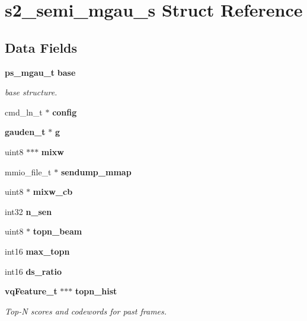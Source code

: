 \section{s2\+\_\+semi\+\_\+mgau\+\_\+s Struct Reference}
\label{structs2__semi__mgau__s}
\subsection*{Data Fields}
\begin{DoxyCompactItemize}
\item 
\textbf{ ps\+\_\+mgau\+\_\+t} \textbf{ base}
\begin{DoxyCompactList}\small\item\em base structure. \end{DoxyCompactList}\item 
\mbox{\label{structs2__semi__mgau__s_ababf1e9522fb14c351df9a6b6d3957bc}} 
cmd\+\_\+ln\+\_\+t $\ast$ {\bfseries config}
\item 
\mbox{\label{structs2__semi__mgau__s_ab9d5d5dcafa40af8869ceabb60a8d35b}} 
\textbf{ gauden\+\_\+t} $\ast$ {\bfseries g}
\item 
\mbox{\label{structs2__semi__mgau__s_a1207b5db7e37e9477f3b55cc2d447050}} 
uint8 $\ast$$\ast$$\ast$ {\bfseries mixw}
\item 
\mbox{\label{structs2__semi__mgau__s_a66a60126fe057d36640cbf69f916bca3}} 
mmio\+\_\+file\+\_\+t $\ast$ {\bfseries sendump\+\_\+mmap}
\item 
\mbox{\label{structs2__semi__mgau__s_a20ec32cb8c38fb48909b2cc7c5412c3b}} 
uint8 $\ast$ {\bfseries mixw\+\_\+cb}
\item 
\mbox{\label{structs2__semi__mgau__s_a021287621e71f8b74f23197d0efd1e9e}} 
int32 {\bfseries n\+\_\+sen}
\item 
\mbox{\label{structs2__semi__mgau__s_af530876b144ac13df103afe2ccdba2fc}} 
uint8 $\ast$ {\bfseries topn\+\_\+beam}
\item 
\mbox{\label{structs2__semi__mgau__s_adda80afc828a938dcdd08f976417d35a}} 
int16 {\bfseries max\+\_\+topn}
\item 
\mbox{\label{structs2__semi__mgau__s_a91b9da8bb484f4552ba0ff47cb262d17}} 
int16 {\bfseries ds\+\_\+ratio}
\item 
\textbf{ vq\+Feature\+\_\+t} $\ast$$\ast$$\ast$ \textbf{ topn\+\_\+hist}
\begin{DoxyCompactList}\small\item\em Top-\/N scores and codewords for past frames. \end{DoxyCompactList}\item 

\end{DoxyCompactItemize}
